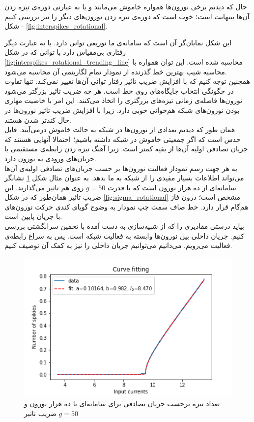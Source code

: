حال که دیدیم برخی نورون‌ها همواره خاموش می‌مانند و یا به عبارتی دوره‌ی تیزه زدن آن‌ها بینهایت است؛ خوب است که دوره‌ی تیزه زدن‌ نورون‌های دیگر را نیز بررسی کنیم - شکل \ref{fig:interspikes_rotational}.

این شکل نمایان‌گر آن است که سامانه‌ی ما توزیعی توانی دارد. یا به عبارت دیگر رفتاری بی‌مقیاس دارد با توانی که در شکل  
\ref{fig:interspikes_rotational_trending_line}
محاسبه شده است. این توان همواره با محاسبه شیب بهترین خط گذرنده از نمودار تمام لگاریتمی آن محاسبه می‌شود.\\

همچنین توجه کنیم که با افزایش ضریب تاثیر رفتار توانی آن‌ها تغییر نمی‌کند. تنها تفاوت در چگونگی انتخاب جایگاه‌های روی خط است. هر چه ضریب تاثیر بزرگتر می‌شود نورون‌ها فاصله‌ی زمانی تیزه‌های بزرگتری را اتخاذ می‌کنند. این امر با خاصیت مهاری بودن نورون‌های شبکه هم‌خوانی خوبی دارد. زیرا با افزایش ضریب تاثیر نورون‌ها در حال کندتر شدن هستند.
\\


همان طور که دیدیم تعدادی از نورون‌ها در شبکه به حالت خاموش درمی‌آیند. قابل حدس است که اگر جمعیتی خاموش در شبکه داشته باشیم؛ احتمالا آنهایی هستند که جریان تصادفی اولیه آن‌ها از بقیه کمتر است. زیرا آهنگ تیزه زدن رابطه‌ی مستقیمی با جریان‌های ورودی به نورون دارد.\\

به هر جهت رسم نمودار فعالیت نورون‌ها بر حسب جریان‌های تصادفی اولیه‌ی آن‌ها می‌تواند اطلاعات بسیار مفیدی را از شبکه به ما بدهد. به عنوان مثال شکل \ref{fig:spikes_num_vs_background_current} نشانگر سامانه‌ای از ده هزار نورون است که با قدرت $g=50$ روی هم تاثیر می‌گذارند. این ضریب تاثیر همان‌طور که در شکل
\ref{fig:sigma_rotational}
مشخص است؛ درون فاز هم‌گام قرار دارد. خط صاف سمت چپ نمودار به وضوح گویای کندی حرکت نورون‌های با جریان پایین است.\\

بیاید درستی مقادیری را که از شبیه‌سازی به دست آمده با تخمین سرانگشتی بررسی کنیم. جریان داخلی بین نورون‌ها وابسته به فعالیت شبکه است. پس به سراغ رابطه‌ی فعالیت می‌رویم. می‌دانیم می‌توانیم جریان داخلی را نیز به کمک آن توصیف کنیم.
\begin{figure}
	\centering
	\includegraphics[width = 0.7 \textwidth]{../papers_studies/figs/Rotational/spikies_num_vs_input_fitted_curve_g50_input_3.5_13.5.png}
	\caption{تعداد تیزه برحسب جریان تصادفی برای سامانه‌ای با ده هزار نورون و ضریب تاثیر $g=50$}
	\label{fig:spikes_num_vs_background_current}
\end{figure}


